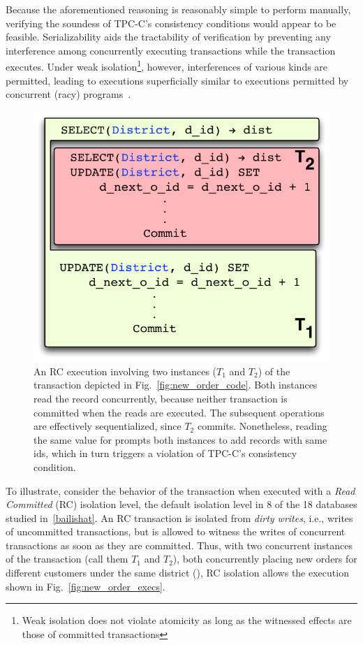 Because the aforementioned reasoning is reasonably simple to perform
manually, verifying the soundess of TPC-C's consistency conditions
would appear to be feasible.  Serializability aids the tractability of
verification by preventing any interference among concurrently
executing transactions while the  transaction executes.
Under weak isolation\footnote{Weak isolation does not violate
  atomicity as long as the witnessed effects are those of committed
  transactions}, however, interferences of various kinds are
permitted, leading to executions superficially similar to executions
permitted by concurrent (racy) programs~\cite{GHE15,HPQ+15}.
\begin{figure}
\includegraphics[scale=0.45]{Figures/motiv-eg-1-b}
\caption{\small An RC execution involving two instances ($T_1$ and
  $T_2$) of the  transaction depicted in
  Fig.~\ref{fig:new_order_code}. 
  Both instances read the   record concurrently,
  because neither transaction is committed when the reads are
  executed.  The subsequent operations are effectively sequentialized,
  since $T_2$ commits. Nonetheless, reading the same value for
   prompts both instances to add  records
  with same ids, which in turn triggers a violation of TPC-C's
  consistency condition.}
\label{fig:new_order_exec}
\end{figure}
To illustrate, consider the behavior of the  transaction
when executed with a \emph{Read Committed} (RC) isolation level, the
default isolation level in 8 of the 18 databases studied
in~\ref{bailishat}.  An RC transaction is isolated from \emph{dirty
  writes}, i.e., writes of uncommitted transactions, but is allowed to
witness the writes of concurrent transactions as soon as they are
committed. Thus, with two concurrent instances of the 
transaction (call them $T_1$ and $T_2$), both concurrently placing new
orders for different customers under the same district (), RC
isolation allows the execution shown in
Fig.~\ref{fig:new_order_execs}.


